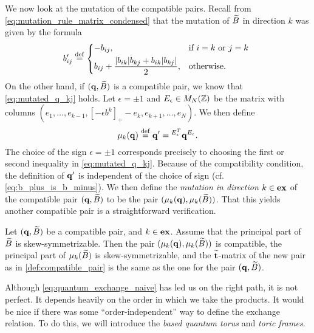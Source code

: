 We now look at the mutation of the compatible pairs. Recall from
\cref{eq:mutation_rule_matrix_condensed} that the mutation of $\widetilde{B}$ in direction $k$
was given by the formula
\begin{equation*}
	b'_{ij} \defeq \begin{dcases*}
		-b_{ij},                                            & if $i = k$ or $j = k$ \\
		b_{ij} + \frac{|b_{ik}|b_{kj} + b_{ik}|b_{kj}|}{2}, & otherwise.
	\end{dcases*}
\end{equation*}
%
On the other hand, if $(\mathbf{q}, \widetilde{B})$ is a compatible pair, we know that
\cref{eq:mutated_q_kj} holds. Let $\epsilon = \pm 1$ and $E_{\epsilon} \in M_N(\mathbb{Z})$
be the matrix with columns $(e_1, \dots, e_{k-1}, [-\epsilon b^k]_{+} - e_k, e_{k+1},
	\dots, e_N)$. We then define
\begin{equation}\label{eq:def_mutation_q}
	\mu_k(\mathbf{q}) \overset{\mathrm{def}}{=} \mathbf{q}' = \prescript{E_{\epsilon}^T}{}{}\mathbf{q}^{E_\epsilon}.
\end{equation}
%
The choice of the sign $\epsilon = \pm 1$ corresponds precisely to choosing the first
or second inequality in \cref{eq:mutated_q_kj}. Because of the compatibility condition,
the definition of $\mathbf{q}'$ is independent of the choice of sign (cf.
\cref{eq:b_plus_is_b_minus}). We then define the \emph{mutation in direction $k \in
		\mathbf{ex}$} of the compatible pair $(\mathbf{q}, \widetilde{B})$ to be
the pair $(\mu_k (\mathbf{q}),\mu_k (\widetilde{B}) )$. That this yields another compatible pair is a
straightforward verification.
\begin{proposition}\label{prop:mutation_preserves_good_things}

	Let $(\mathbf{q}, \widetilde{B})$ be a compatible pair, and $k \in \mathbf{ex}$. Assume that the principal part
	of $\widetilde{B}$ is skew-symmetrizable. Then the pair $(\mu_k (\mathbf{q}), \mu_k(\widetilde{B}))$ is
	compatible, the principal part of $\mu_k(\widetilde{B})$ is skew-symmetrizable, and the
	$\widetilde{\mathbf{t}}$-matrix of the new pair as in \cref{def:compatible_pair} is the same as the
	one for the pair $(\mathbf{q}, \widetilde{B})$.
\end{proposition}

\medskip

Although \cref{eq:quantum_exchange_naive} has led us on the right path, it is not
perfect. It depends heavily on the order in which we take the products. It would be
nice if there was some ``order-independent'' way to define the exchange relation. To do
this, we will introduce the \emph{based quantum torus} and
\emph{toric frames}.

